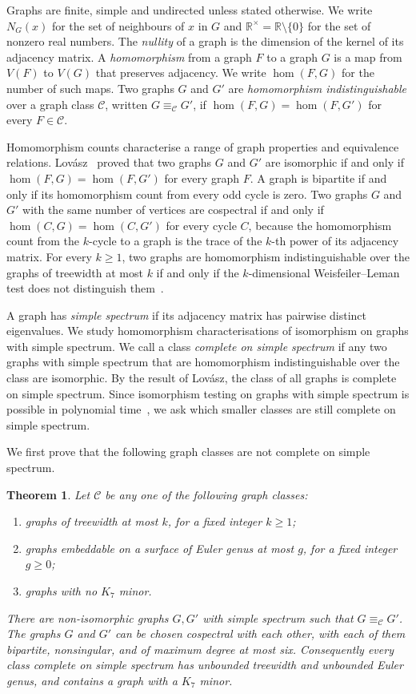 \documentclass[10pt,a4paper]{article}
\theoremstyle{plain}
\newtheorem{theorem}{Theorem}
\theoremstyle{definition}
\newcommand{\R}{\mathbb{R}}
\begin{document}
Graphs are finite, simple and undirected unless stated otherwise.
We write $N_G(x)$ for the set of neighbours of $x$ in $G$ and
$\R^\times=\R\setminus\{0\}$ for the set of nonzero real numbers.
The \emph{nullity} of a graph is the dimension of the kernel of its
adjacency matrix.
A \emph{homomorphism} from a graph $F$ to a graph $G$
is a map from $V(F)$ to $V(G)$ that preserves adjacency. We write
$\hom(F,G)$ for the number of such maps. Two graphs $G$ and $G'$ are \emph{homomorphism
indistinguishable} over a graph class $\mathcal C$, written
$G\equiv_{\mathcal C}G'$, if
$\hom(F,G)=\hom(F,G')$ for every $F\in\mathcal C$.

Homomorphism counts characterise a range of graph properties and
equivalence relations. Lov\'asz~\cite{Lovasz1967} proved that two graphs
$G$ and $G'$ are isomorphic if and only if $\hom(F,G)=\hom(F,G')$ for every
graph $F$.
A graph is bipartite if and only if its homomorphism count from every odd
cycle is zero. Two graphs $G$ and $G'$ with the same number of vertices
are cospectral if and only if $\hom(C,G)=\hom(C,G')$ for every cycle $C$,
because the homomorphism count from the $k$-cycle to a graph is the trace
of the $k$-th power of its adjacency matrix. For every $k\geq1$, two graphs are
homomorphism indistinguishable over the graphs of treewidth at most $k$ if
and only if the $k$-dimensional Weisfeiler--Leman test does not distinguish
them~\cite{Dvorak2010,DellGroheRattan2018}.

A graph has \emph{simple spectrum} if its adjacency matrix has pairwise
distinct eigenvalues. We study homomorphism characterisations of
isomorphism on graphs with simple spectrum.
We call a class \emph{complete on simple spectrum} if any two graphs with
simple spectrum that are homomorphism indistinguishable over the class
are isomorphic.
By the result of Lov\'asz, the class of all graphs is complete on simple
spectrum. Since isomorphism testing on graphs with simple spectrum is
possible in polynomial time~\cite{BabaiGrigoryevMount1982}, we ask which
smaller classes are still complete on simple spectrum.

We first prove that the following graph classes are not complete on
simple spectrum.


\begin{theorem}\label{thm:incompleteness}
Let $\mathcal C$ be any one of the following graph classes:
\begin{enumerate}
 \item graphs of treewidth at most $k$, for a fixed integer $k\geq1$;
 \item graphs embeddable on a surface of Euler genus at most $g$, for a fixed integer $g\geq0$;
 \item graphs with no $K_7$ minor.
\end{enumerate}
There are non-isomorphic graphs $G,G'$ with simple spectrum such that
$G\equiv_{\mathcal C}G'$.
The graphs $G$ and $G'$ can be chosen cospectral with each other, with
each of them bipartite, nonsingular, and of maximum degree at most six.
Consequently every class complete on simple spectrum has unbounded treewidth
and unbounded Euler genus, and contains a graph with a $K_7$ minor.
\end{theorem}
\end{document}
